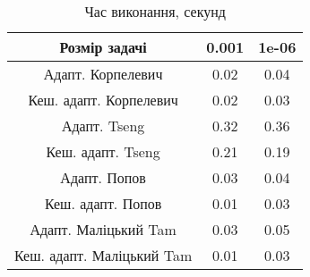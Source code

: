 \begin{table}[H]
	\centering
	\begin{tabular}{|c||c|c|}\hline
		Розмір задачі & 0.001 & 1e-06 \\ \hline \hline
		Адапт. Корпелевич & 0.02 & 0.04 \\ \hline
		Кеш. адапт. Корпелевич & 0.02 & 0.03 \\ \hline
		Адапт. Tseng & 0.32 & 0.36 \\ \hline
		Кеш. адапт. Tseng & 0.21 & 0.19 \\ \hline
		Адапт. Попов & 0.03 & 0.04 \\ \hline
		Кеш. адапт. Попов & 0.01 & 0.03 \\ \hline
		Адапт. Маліцький Tam & 0.03 & 0.05 \\ \hline
		Кеш. адапт. Маліцький Tam & 0.01 & 0.03 \\ \hline
	\end{tabular}
	\caption{Час виконання, секунд}
\end{table}
